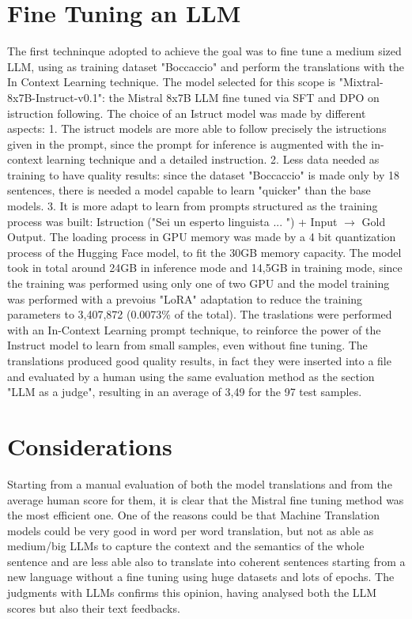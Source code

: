 \documentclass{article}
\begin{document}
\section{Fine Tuning an LLM}
The first techninque adopted to achieve the goal was to fine tune a medium sized LLM, using as training dataset "Boccaccio" and perform the translations with the In Context Learning technique.
The model selected for this scope is "Mixtral-8x7B-Instruct-v0.1": the Mistral 8x7B LLM fine tuned via SFT and DPO on istruction following. The choice of an Istruct model was made by different aspects: 1. The istruct models are more able to follow precisely the istructions given in the prompt, since the prompt for inference is augmented with the in-context learning technique and a detailed instruction. 2. Less data needed as training to have quality results: since the dataset "Boccaccio" is made only by 18 sentences, there is needed a model capable to learn "quicker" than the base models. 3. It is more adapt to learn from prompts structured as the training process was built: Istruction ("Sei un esperto linguista ... ") + Input $\rightarrow$ Gold Output. The loading process in GPU memory was made by a 4 bit quantization process of the Hugging Face model, to fit the 30GB memory capacity. The model took in total around 24GB in inference mode and 14,5GB in training mode, since the training was performed using only one of two GPU and the model training was performed with a prevoius "LoRA" adaptation to reduce the training parameters to 3,407,872 (0.0073\% of the total). The traslations were performed with an In-Context Learning prompt technique, to reinforce the power of the Instruct model to learn from small samples, even without fine tuning. The translations produced good quality results, in fact they were inserted into a file and evaluated by a human using the same evaluation method as the section "LLM as a judge", resulting in an average of 3,49 for the 97 test samples.

\section{Considerations}
Starting from a manual evaluation of both the model translations and from the average human score for them, it is clear that the Mistral fine tuning method was the most efficient one. One of the reasons could be that Machine Translation models could be very good in word per word translation, but not as able as medium/big LLMs to capture the context and the semantics of the whole sentence and are less able also to translate into coherent sentences starting from a new language without a fine tuning using huge datasets and lots of epochs. The judgments with LLMs confirms this opinion, having analysed both the LLM scores but also their text feedbacks.
\end{document}
